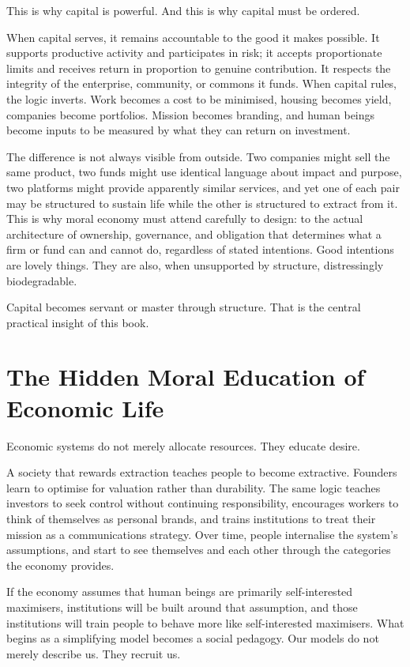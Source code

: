 \documentclass[11pt,a4paper,oneside]{book}
\begin{document}
This is why capital is powerful. And this is why capital must be ordered.

When capital serves, it remains accountable to the good it makes possible. It supports productive activity and participates in risk; it accepts proportionate limits and receives return in proportion to genuine contribution. It respects the integrity of the enterprise, community, or commons it funds. When capital rules, the logic inverts. Work becomes a cost to be minimised, housing becomes yield, companies become portfolios. Mission becomes branding, and human beings become inputs to be measured by what they can return on investment.

The difference is not always visible from outside. Two companies might sell the same product, two funds might use identical language about impact and purpose, two platforms might provide apparently similar services, and yet one of each pair may be structured to sustain life while the other is structured to extract from it. This is why moral economy must attend carefully to design: to the actual architecture of ownership, governance, and obligation that determines what a firm or fund can and cannot do, regardless of stated intentions. Good intentions are lovely things. They are also, when unsupported by structure, distressingly biodegradable.

Capital becomes servant or master through structure. That is the central practical insight of this book.

\section*{The Hidden Moral Education of Economic Life}

Economic systems do not merely allocate resources. They educate desire.

A society that rewards extraction teaches people to become extractive. Founders learn to optimise for valuation rather than durability. The same logic teaches investors to seek control without continuing responsibility, encourages workers to think of themselves as personal brands, and trains institutions to treat their mission as a communications strategy. Over time, people internalise the system's assumptions, and start to see themselves and each other through the categories the economy provides.

If the economy assumes that human beings are primarily self-interested maximisers, institutions will be built around that assumption, and those institutions will train people to behave more like self-interested maximisers. What begins as a simplifying model becomes a social pedagogy. Our models do not merely describe us. They recruit us.
\end{document}

